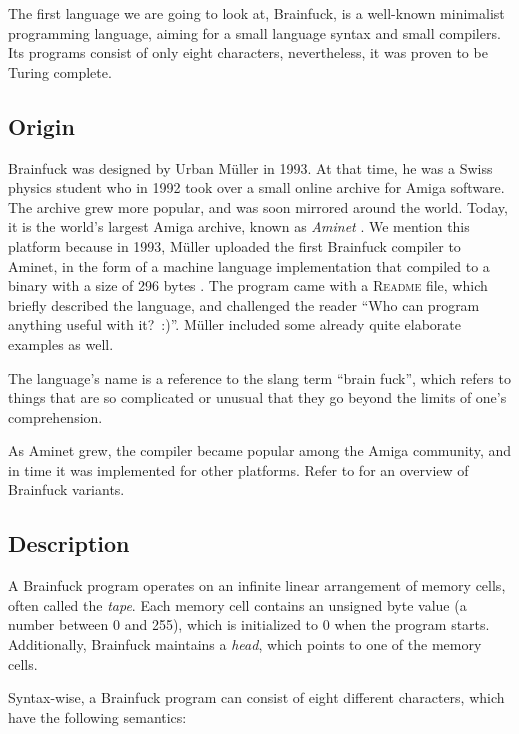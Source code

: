 The first language we are going to look at, Brainfuck, is a well-known minimalist programming language, aiming for a small language syntax and small compilers. Its programs consist of only eight characters, nevertheless, it was proven to be Turing complete.

\subsection{Origin}

Brainfuck was designed by Urban Müller in 1993. At that time, he was a Swiss physics student who in 1992 took over a small online archive for Amiga software. The archive grew more popular, and was soon mirrored around the world. Today, it is the world's largest Amiga archive, known as \emph{Aminet} \cite{muller1993aminet}. We mention this platform because in 1993, Müller uploaded the first Brainfuck compiler to Aminet, in the form of a machine language implementation that compiled to a binary with a size of 296 bytes \cite{muller1993240}. The program came with a \textsc{Readme} file, which briefly described the language, and challenged the reader “Who can program anything useful with it?~:)”. Müller included some already quite elaborate examples as well.

The language's name is a reference to the slang term “brain fuck”, which refers to things that are so complicated or unusual that they go beyond the limits of one's comprehension.

As Aminet grew, the compiler became popular among the Amiga community, and in time it was implemented for other platforms. Refer to  for an overview of Brainfuck variants.

\subsection{Description}

A Brainfuck program operates on an infinite linear arrangement of memory cells, often called the \emph{tape}. Each memory cell contains an unsigned byte value (a number between 0 and 255), which is initialized to 0 when the program starts. Additionally, Brainfuck maintains a \emph{head}, which points to one of the memory cells.

Syntax-wise, a Brainfuck program can consist of eight different characters, which have the following semantics:

